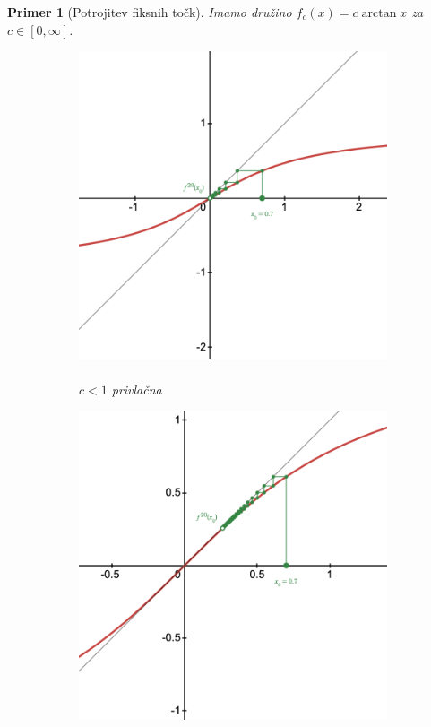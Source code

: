 \documentclass{article}
\newtheorem{primer}{Primer}
\begin{document}
\begin{primer}[Potrojitev fiksnih točk]
Imamo družino $f_c(x) = c\arctan{x}$ za $c\in [0, \infty]$.

\begin{figure}[h]
    \centering
    \begin{subfigure}[c]{0.28\textwidth}
        \centering
        \includegraphics[width=\textwidth]{Grafi/cobweb171.png}
        \caption{\\$c<1$ privlačna}
        \label{fig:cobweb31}
    \end{subfigure}
    \begin{subfigure}[c]{0.28\textwidth}
        \centering
        \includegraphics[width=\textwidth]{Grafi/cobweb172.png}

\end{subfigure}
\end{figure}
\end{primer}
\end{document}
